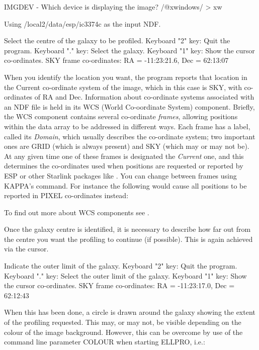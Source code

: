 \documentclass[twoside,11pt]{starlink}
\begin{document}
\begin{terminalv}
IMGDEV - Which device is displaying the image? /@xwindows/ > xw

Using /local2/data/esp/ic3374c as the input NDF.

Select the centre of the galaxy to be profiled.
Keyboard "2" key:   Quit the program.
Keyboard "." key:   Select the galaxy.
Keyboard "1" key:   Show the cursor co-ordinates.
  SKY frame co-ordinates:  RA = -11:23:21.6,  Dec = 62:13:07
\end{terminalv}

When you identify the location you want,
the program reports that location in the Current co-ordinate
system of the image, which in this case is SKY,
with co-ordinates of RA and Dec.
Information about co-ordinate systems associated with an NDF file is held
in its WCS (World Co-oordinate System) component.
Briefly, the WCS component contains several co-ordinate \emph{frames},
allowing positions within the data array to be addressed in different ways.
Each frame has a label, called its \emph{Domain}, which usually describes
the co-ordinate system; two important ones are GRID (which is
always present) and SKY (which may or may not be).
At any given time one of these frames is designated the \emph{Current\/} one,
and this determines the co-ordinates used when positions are requested
or reported by ESP or other Starlink packages like .
You can change between frames using KAPPA's
 command.
For instance the following would cause all positions to
be reported in PIXEL co-ordinates instead:
\begin{terminalv}
\end{terminalv}
To find out more about WCS components see .

Once the galaxy centre is identified, it is necessary to describe how far out
from the centre you want the profiling to continue (if possible). This is again
achieved via the cursor.

\begin{terminalv}
Indicate the outer limit of the galaxy.
Keyboard "2" key:   Quit the program.
Keyboard "." key:   Select the outer limit of the galaxy.
Keyboard "1" key:   Show the cursor co-ordinates.
  SKY frame co-ordinates:  RA = -11:23:17.0,  Dec = 62:12:43
\end{terminalv}

When this has been done, a circle is drawn around the galaxy showing the extent
of the profiling requested. This may, or may not, be visible depending on the
colour of the image background. However, this can be overcome by use of the
command line parameter COLOUR when starting ELLPRO, i.e.:
\end{document}

